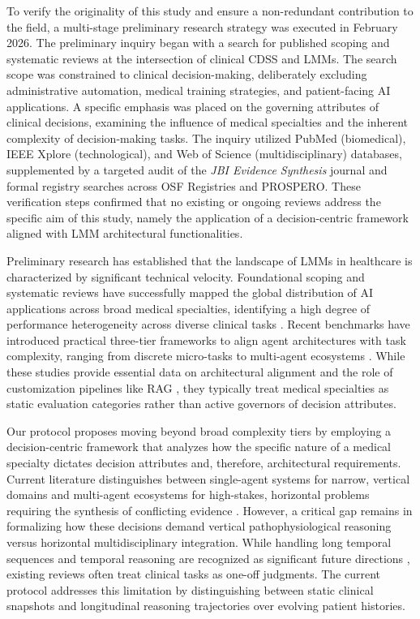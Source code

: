 \documentclass[review,12pt]{elsarticle}
\begin{document}
To verify the originality of this study and ensure a non-redundant contribution to the field, a multi-stage preliminary research strategy was executed in February 2026.  The preliminary inquiry began with a search for published scoping and systematic reviews at the intersection of clinical CDSS and LMMs. The search scope was constrained to clinical decision-making, deliberately excluding administrative automation, medical training strategies, and patient-facing AI applications. A specific emphasis was placed on the governing attributes of clinical decisions, examining the influence of medical specialties and the inherent complexity of decision-making tasks.  The inquiry utilized PubMed (biomedical), IEEE Xplore (technological), and Web of Science (multidisciplinary) databases, supplemented by a targeted audit of the \textit{JBI Evidence Synthesis} journal and formal registry searches across OSF Registries and PROSPERO.  These verification steps confirmed that no existing or ongoing reviews address the specific aim of this study, namely the application of a decision-centric framework aligned with LMM architectural functionalities.

Preliminary research has established that the landscape of LMMs in healthcare is characterized by significant technical velocity. Foundational scoping and systematic reviews have successfully mapped the global distribution of AI applications across broad medical specialties, identifying a high degree of performance heterogeneity across diverse clinical tasks \cite{alkalbani2025systematic, bedi2025testing}.  Recent benchmarks have introduced practical three-tier frameworks to align agent architectures with task complexity, ranging from discrete micro-tasks to multi-agent ecosystems \cite{gorenshtein2025ai}. While these studies provide essential data on architectural alignment and the role of customization pipelines like RAG \cite{yang2026building}, they typically treat medical specialties as static evaluation categories rather than active governors of decision attributes.

 Our protocol proposes moving beyond broad complexity tiers by employing a decision-centric framework that analyzes how the specific nature of a medical specialty dictates decision attributes and, therefore, architectural requirements. Current literature distinguishes between single-agent systems for narrow, vertical domains and multi-agent ecosystems for high-stakes, horizontal problems requiring the synthesis of conflicting evidence \cite{gorenshtein2025ai, seoane_2025_prospero}. However, a critical gap remains in formalizing how these decisions demand vertical pathophysiological reasoning versus horizontal multidisciplinary integration.  While handling long temporal sequences and temporal reasoning are recognized as significant future directions \cite{asif2026impact}, existing reviews often treat clinical tasks as one-off judgments. The current protocol addresses this limitation by distinguishing between static clinical snapshots and longitudinal reasoning trajectories over evolving patient histories.
\end{document}
